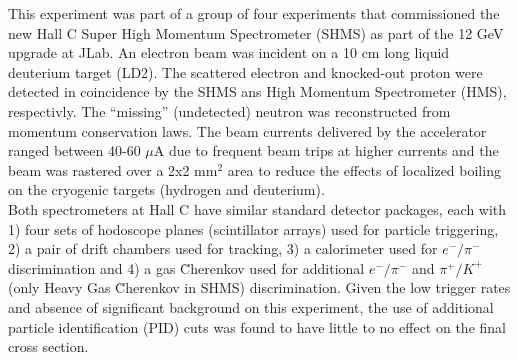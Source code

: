 \indent This experiment was part of a group of four experiments that commissioned the new Hall C Super High Momentum Spectrometer (SHMS) as part of the 12 GeV upgrade at JLab.
An electron beam was incident on a 10 cm long liquid deuterium target (LD2). The scattered electron and knocked-out proton were detected in coincidence
by the SHMS ans High Momentum Spectrometer (HMS), respectivly. The ``missing'' (undetected) neutron was reconstructed from momentum conservation laws.
The beam currents delivered by the accelerator ranged between 40-60 $\mu$A due to frequent beam trips at higher currents and the beam was rastered over a 2x2 mm$^{2}$ area to reduce
the effects of localized boiling on the cryogenic targets (hydrogen and deuterium). \\
\indent Both spectrometers at Hall C have similar standard detector packages, each with 1) four sets of hodoscope planes (scintillator arrays) used for particle triggering, 2) a pair of drift chambers used for
tracking, 3) a calorimeter used for $e^{-}/\pi^{-}$ discrimination and 4) a gas \u{C}herenkov used for additional $e^{-}/\pi^{-}$ and $\pi^{+}/K^{+}$ (only Heavy Gas \u{C}herenkov in SHMS) discrimination.
Given the low trigger rates and absence of significant background on this experiment, the use of additional particle identification (PID) cuts was found to have little to no effect on the final
cross section.
\indent 
